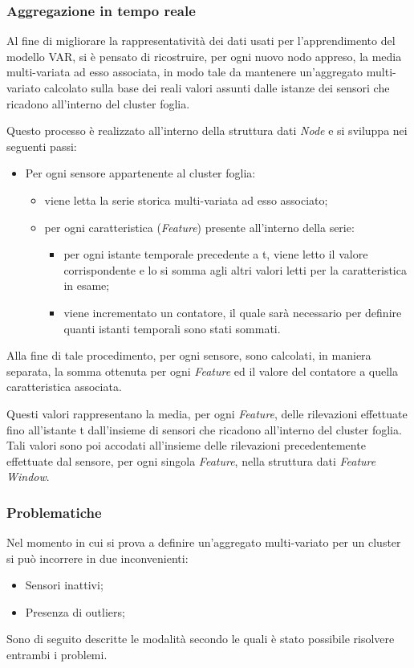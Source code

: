 \documentclass[12pt,a4paper,twoside,openright]{book}
\begin{document}
\subsubsection{Aggregazione in tempo reale}
Al fine di migliorare la rappresentatività dei dati usati per l'apprendimento del modello VAR, si è pensato di ricostruire, per ogni nuovo nodo appreso, la media multi-variata ad esso associata, in modo tale da mantenere un'aggregato multi-variato calcolato sulla base dei reali valori assunti dalle istanze dei sensori che ricadono all'interno del cluster foglia.

Questo processo è realizzato all'interno della struttura dati \textit{Node} e si sviluppa nei seguenti passi:
\begin{itemize}
\item Per ogni sensore appartenente al cluster foglia:
\begin{itemize}
\item viene letta la serie storica multi-variata ad esso associato;
\item per ogni caratteristica (\textit{Feature}) presente all'interno della serie:
\begin{itemize}
\item per ogni istante temporale precedente a t, viene letto il valore corrispondente e lo si somma agli altri valori letti per la caratteristica in esame;
\item viene incrementato un contatore, il quale sarà necessario per definire quanti istanti temporali sono stati sommati.
\end{itemize}
\end{itemize}
\end{itemize}

Alla fine di tale procedimento, per ogni sensore, sono calcolati, in maniera separata, la somma ottenuta per ogni \textit{Feature} ed il valore del contatore a quella caratteristica associata.

Questi valori rappresentano la media, per ogni \textit{Feature}, delle rilevazioni effettuate fino all'istante t dall'insieme di sensori che ricadono all'interno del cluster foglia.
Tali valori sono poi accodati all'insieme delle rilevazioni precedentemente effettuate dal sensore, per ogni singola \textit{Feature}, nella struttura dati \textit{Feature Window}. 

\subsubsection{Problematiche}
Nel momento in cui si prova a definire un'aggregato multi-variato per un cluster si può incorrere in due inconvenienti:
\begin{itemize}
\item Sensori inattivi;
\item Presenza di outliers;
\end{itemize}
Sono di seguito descritte le modalità secondo le quali è stato possibile risolvere entrambi i problemi.
\end{document}
